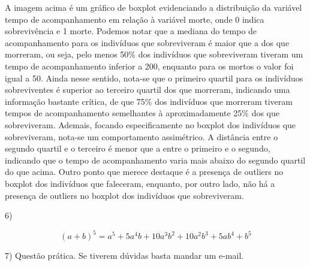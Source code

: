 \documentclass[12pt]{article}
\begin{document}
A imagem acima é um gráfico de boxplot evidenciando a distribuição da variável tempo de acompanhamento em relação à variável morte, onde 0 indica sobrevivência e 1 morte. 
Podemos notar que a mediana do tempo de acompanhamento para os indivíduos que sobreviveram é maior que a dos que morreram, ou seja, pelo menos 50\% dos indivíduos que sobreviveram tiveram um tempo
de acompanhamento inferior a 200, enquanto para os mortos o valor foi igual a 50. Ainda nesse sentido, nota-se que o primeiro quartil para os indivíduos sobreviventes é superior ao terceiro quartil
dos que morreram, indicando uma informação bastante crítica, de que 75\% dos indivíduos que morreram tiveram tempos de acompanhamento semelhantes à aproximadamente 25\% dos que sobreviveram. Ademais, focando especificamente no boxplot dos indivíduos que sobreviveram, nota-se 
um comportamento assimétrico. A distância entre o segundo quartil e o terceiro é menor que a entre o primeiro e o segundo, indicando que o tempo de acompanhamento
varia mais abaixo do segundo quartil do que acima. Outro ponto que merece destaque é a presença de outliers no boxplot dos indivíduos que faleceram, enquanto, por 
outro lado, não há a presença de outliers no boxplot dos indivíduos que sobreviveram.

\vspace{5px}

6) 

$$(a+b)^5 = a^5 + 5a^4b + 10a^3b^2 + 10a^2b^3 + 5ab^4 + b^5$$
\vspace{5px}

7) Questão prática. Se tiverem dúvidas basta mandar um e-mail. 
\end{document}
